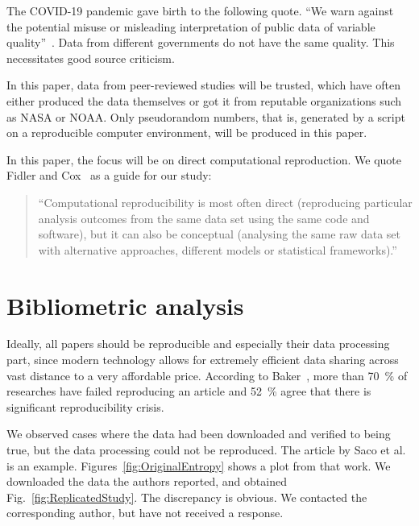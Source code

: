 The COVID-19 pandemic gave birth to the following quote. 
``We warn against the potential misuse or misleading interpretation of public data of variable quality''~\cite{Struelens2021}. 
Data from different governments do not have the same quality. 
This necessitates good source criticism.
 
In this paper, data from peer-reviewed studies will be trusted, which have often either produced the data themselves or got it from reputable organizations such as NASA or NOAA. 
Only pseudorandom numbers, that is, generated by a script on a reproducible computer environment, will be produced in this paper.

In this paper, the focus will be on direct computational reproduction.
We quote Fidler and Cox~\cite{Fidler2018} as a guide for our study:
\begin{quote}
``Computational reproducibility is most often direct (reproducing particular analysis outcomes from the same data set using the same code and software), but it can also be conceptual (analysing the same raw data set with alternative approaches, different models or statistical frameworks).''
\end{quote}


\section{Bibliometric analysis}

Ideally, all papers should be reproducible and especially their data processing part, since modern technology allows for extremely efficient data sharing across vast distance to a very affordable price. 
According to Baker~\cite{Baker2016}, more than \SI{70}{\percent} of researches have failed reproducing an article and \SI{52}{\percent} agree that there is significant reproducibility crisis. 

We observed cases where the data had been downloaded and verified to being true, but the data processing could not be reproduced.
The article by Saco et al.~\cite{Saco2010} is an example.
Figures~\ref{fig:OriginalEntropy} shows a plot from that work.
We downloaded the data the authors reported, and obtained Fig.~\ref{fig:ReplicatedStudy}.
The discrepancy is obvious.
We contacted the corresponding author, but have not received a response.

